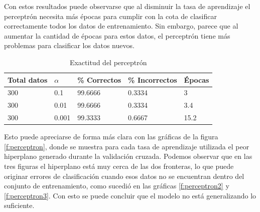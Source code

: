 \documentclass[a4paper]{article}
\begin{document}
		Con estos resultados puede observarse que al disminuir la tasa de aprendizaje el perceptrón necesita más épocas para cumplir con la cota de clasificar correctamente todos los datos de entrenamiento. Sin embargo, parece que al aumentar la cantidad de épocas para estos datos, el perceptrón tiene más problemas para clasificar los datos nuevos.
		
	
		\begin{table}[H]
		\begin{center}
		\begin{tabular}{|l|l|l|l|l|}
		\hline
		Total datos & $\alpha$ & \% Correctos & \% Incorrectos & Épocas\\
		\hline \hline
		300 & 0.1 & 99.6666 & 0.3334 & 3\\ \hline
		300 & 0.01 & 99.6666 & 0.3334 & 3.4\\ \hline
		300 & 0.001 & 99.3333 & 0.6667 & 15.2\\ \hline
		\end{tabular}
		\caption{Exactitud del perceptrón}
		\label{tabla:accPerceptron}
		\end{center}
		\end{table}
					
		Esto puede apreciarse de forma más clara con las gráficas de la figura \ref{f:perceptron}, donde se muestra para cada tasa de aprendizaje utilizada el peor hiperplano generado durante la validación cruzada. Podemos observar que en las tres figuras el hiperplano está muy cerca de las dos fronteras, lo que puede originar errores de clasificación cuando esos datos no se encuentran dentro del conjunto de entrenamiento, como sucedió en las gráficas \ref{f:perceptron2} y \ref{f:perceptron3}. Con esto se puede concluir que el modelo no está generalizando lo suficiente.			
				
\end{document}
